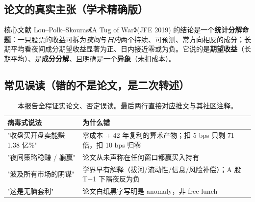 \documentclass[11pt,a4paper,fontset=none]{ctexart}
\begin{document}
\subsection{论文的真实主张（学术精确版）}
核心文献 Lou--Polk--Skouras《A Tug of War》(JFE 2019) 的结论是一个\textbf{统计分解命题}：一只股票的收益可拆为\emph{夜间}与\emph{日内}两个持续、可预测、常方向相反的成分；长期平均看夜间成分期望收益显著为正、日内接近零或为负。它说的是\textbf{期望收益}（长期平均）、是\textbf{成分分解}、且明确是一个\textbf{异象}（未扣成本）。

\subsection{常见误读（错的不是论文，是二次转述）}
\begin{table}[H]\centering\small
\begin{tabular}{p{6cm}p{8.5cm}}
\toprule
病毒式说法 & 为什么错 \\
\midrule
"收盘买开盘卖能赚 1.38 亿\%" & 零成本 + 42 年复利的算术产物；扣 5 bps 只剩 71 倍，扣 10 bps 归零 \\
"夜间策略稳赚 / 躺赢" & 论文从未声称在任何窗口都赢买入持有 \\
"波及所有市场的阴谋" & 学界早有解释（拔河/流动性/信息/风险补偿）；A 股 T+1 下隔夜反为负 \\
"这是无脑套利" & 论文白纸黑字写明是 anomaly，非 free lunch \\
\bottomrule
\end{tabular}
\caption{本报告全程证实论文、否定误读。最后两行直接对应推文与其社区注释。}
\end{table}
\end{document}

